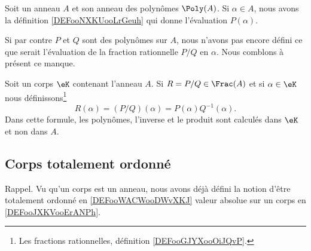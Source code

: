 \begin{normaltext}
	Soit un anneau \( A\) et son anneau des polynômes \( \Poly(A)\). Si \( \alpha\in A\), nous avons la définition \ref{DEFooNXKUooLrGeuh} qui donne l'évaluation \( P(\alpha)\).

	Si par contre \( P\) et \( Q\) sont des polynômes sur \( A\), nous n'avons pas encore défini ce que serait l'évaluation de la fraction rationnelle \( P/Q\) en \( \alpha\). Nous comblons à présent ce manque.
\end{normaltext}

\begin{definition}       \label{DEFooLBIWooCPCaSY}
	Soit un corps \( \eK\) contenant l'anneau \( A\). Si \( R=P/Q\in \Frac(A)\) et si \( \alpha\in \eK\) nous définissons\footnote{Les fractions rationnelles, définition \ref{DEFooGJYXooOiJQvP}.}
	\begin{equation}
		R(\alpha)=(P/Q)(\alpha)=P(\alpha)Q^{-1}(\alpha).
	\end{equation}
	Dans cette formule, les polynômes, l'inverse et le produit sont calculés dans \( \eK\) et non dans \( A\).
\end{definition}


\subsection{Corps totalement ordonné}

Rappel. Vu qu'un corps est un anneau, nous avons déjà défini la notion d'être totalement ordonné en \ref{DEFooWACWooDWvXKJ} valeur absolue sur un corps en \ref{DEFooJXKVooErANPh}.


